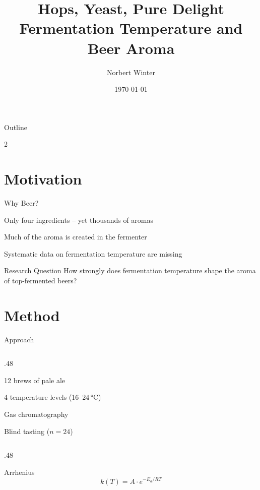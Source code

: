 \documentclass{beamer} %
\title[Hops, Yeast, Pure Delight]{Hops, Yeast, Pure Delight\\Fermentation Temperature and Beer Aroma}
\author{Norbert Winter}
\institute{Institute of Brewing and Fermentation Technology (fictional)}
\date{\today}
\begin{document}
\begin{frame}
  \maketitle
\end{frame}


\begin{frame}{Outline}
    \begin{multicols}{2}
        \tableofcontents
    \end{multicols}
\end{frame}


\section{Motivation}

\begin{frame}{Why Beer?}
  \begin{tugitemize}
    \item Only four ingredients -- yet thousands of aromas
    \item Much of the aroma is created in the \alert{fermenter}
    \item Systematic data on fermentation temperature are missing
  \end{tugitemize}
  \vspace{4mm}
  \begin{block}{Research Question}
    How strongly does fermentation temperature shape the aroma of top-fermented beers?
  \end{block}
\end{frame}

\section{Method}

\begin{frame}{Approach}
  \begin{tugcolumns}
    \begin{column}{.48\linewidth}
      \begin{tugenumerate}
        \item 12 brews of pale ale
        \item 4 temperature levels (16--24\,°C)
        \item Gas chromatography
        \item Blind tasting ($n=24$)
      \end{tugenumerate}
    \end{column}
    \begin{column}{.48\linewidth}
      \begin{block}{Arrhenius}
        \[ k(T) = A \cdot e^{-E_a / RT} \]
      \end{block}
    \end{column}
  \end{tugcolumns}
\end{frame}
\end{document}
